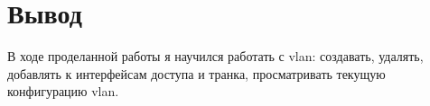 \chapter{Вывод}
В ходе проделанной работы я научился работать с vlan: создавать, удалять, добавлять к интерфейсам доступа и транка,
просматривать текущую конфигурацию vlan.
\endinput